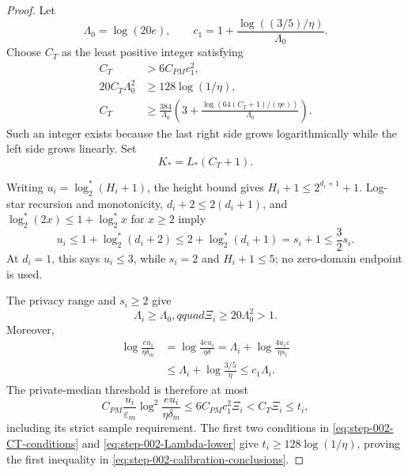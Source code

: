\begin{proof}
Let
\[
\Lambda_0=\log(20e),\qquad
c_1=1+\frac{\log((3/5)/\eta)}{\Lambda_0}.
\]
Choose \(C_T\) as the least positive integer satisfying
\begin{equation}\label{eq:step-002-CT-conditions}
\begin{split}
C_T&>6C_{PM}c_1^2,\\
20C_T\Lambda_0^2&\ge128\log(1/\eta),\\
C_T&\ge\frac{384}{\Lambda_0}
\left(3+\frac{\log(64(C_T+1)/(\eta e))}{\Lambda_0}\right).
\end{split}
\end{equation}
Such an integer exists because the last right side grows logarithmically
while the left side grows linearly.  Set
\begin{equation}\label{eq:step-002-Kstar}
K_*=L_*(C_T+1).
\end{equation}

Writing \(u_i=\log_2^*(H_i+1)\), the height bound gives
\(H_i+1\le2^{d_i+1}+1\).  Log-star recursion and monotonicity,
\(d_i+2\le2(d_i+1)\), and
\(\log_2^*(2x)\le1+\log_2^*x\) for \(x\ge2\) imply
\begin{equation}\label{eq:step-002-height-logstar}
u_i\le1+\log_2^*(d_i+2)
\le2+\log_2^*(d_i+1)=s_i+1\le\frac32s_i.
\end{equation}
At \(d_i=1\), this says \(u_i\le3\), while \(s_i=2\) and
\(H_i+1\le5\); no zero-domain endpoint is used.

The privacy range and \(s_i\ge2\) give
\begin{equation}\label{eq:step-002-Lambda-lower}
\Lambda_i\ge\Lambda_0,qquad
\Xi_i\ge20\Lambda_0^2>1.
\end{equation}
Moreover,
\begin{equation}\label{eq:step-002-median-log}
\begin{split}
\log\frac{eu_i}{\eta\delta_m}
&=\log\frac{4eu_i}{\eta\delta}
=\Lambda_i+\log\frac{4u_i\varepsilon}{\eta s_i}\\
&\le\Lambda_i+\log\frac{3/5}{\eta}
\le c_1\Lambda_i.
\end{split}
\end{equation}
The private-median threshold is therefore at most
\begin{equation}\label{eq:step-002-median-threshold}
C_{PM}\frac{u_i}{\varepsilon_m}
\log^2\frac{eu_i}{\eta\delta_m}
\le6C_{PM}c_1^2\Xi_i<C_T\Xi_i\le t_i,
\end{equation}
including its strict sample requirement.  The first two conditions in
\eqref{eq:step-002-CT-conditions} and
\eqref{eq:step-002-Lambda-lower} give
\(t_i\ge128\log(1/\eta)\), proving the first inequality in
\eqref{eq:step-002-calibration-conclusions}.


\end{proof}
